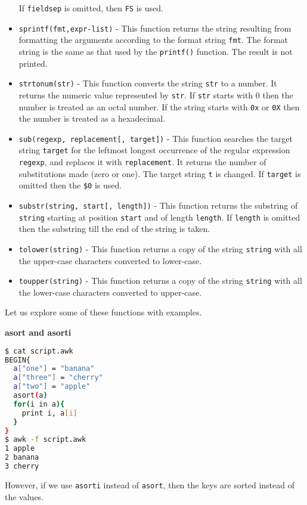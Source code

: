 \begin{itemize}
    If \lstinline|fieldsep| is omitted, then \lstinline|FS| is used.
  \item \lstinline|sprintf(fmt,expr-list)| - This function returns the string resulting from formatting the arguments according to the format string \lstinline|fmt|. The format string is the same as that used by the \lstinline|printf()| function. The result is not printed.
  \item \lstinline|strtonum(str)| - This function converts the string \lstinline|str| to a number. It returns the numeric value represented by \lstinline|str|. If \lstinline|str| starts with $0$ then the number is treated as an octal number.
    If the string starts with \lstinline|0x| or \lstinline|0X| then the number is treated as a hexadecimal.
  \item \lstinline|sub(regexp, replacement[, target])| - This function searches the target string \lstinline|target| for the leftmost longest occurrence of the regular expression \lstinline|regexp|, and replaces it with \lstinline|replacement|. It returns the number of substitutions made (zero or one). The target string \lstinline|t| is changed. If \lstinline|target| is omitted then the \lstinline|$0| is used.
  \item \lstinline|substr(string, start[, length])| - This function returns the substring of \lstinline|string| starting at position \lstinline|start| and of length \lstinline|length|. If \lstinline|length| is omitted then the substring till the end of the string is taken.
  \item \lstinline|tolower(string)| - This function returns a copy of the string \lstinline|string| with all the upper-case characters converted to lower-case.
  \item \lstinline|toupper(string)| - This function returns a copy of the string \lstinline|string| with all the lower-case characters converted to upper-case.
\end{itemize}

Let us explore some of these functions with examples.

\textbf{asort and asorti}

\begin{lstlisting}[language=bash]
$ cat script.awk
BEGIN{
  a["one"] = "banana"
  a["three"] = "cherry"
  a["two"] = "apple"
  asort(a)
  for(i in a){
    print i, a[i]
  }
}
$ awk -f script.awk
1 apple
2 banana
3 cherry
\end{lstlisting}

However, if we use \lstinline|asorti| instead of \lstinline|asort|, then the keys are sorted instead of the values.

